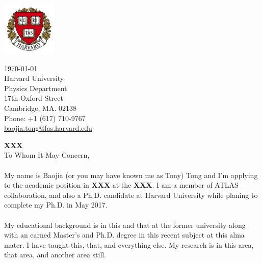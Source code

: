 \documentclass[letterpaper,11pt,oneside]{article}
\begin{document}
\begin{minipage}{.5\textwidth}
  \includegraphics[height=7em]{Harvard}
\end{minipage}
\begin{minipage}{.5\textwidth}
\begin{flushright}
 \today                           \\
 \vspace{1em}                              
 Harvard University            \\
 Physics Department                  \\
 17th Oxford Street                       \\
 Cambridge, MA. 02138   \\
 Phone: +1 (617) 710-9767         \\
\href{mailto:baojia.tong@fas.harvard.edu}{baojia.tong@fas.harvard.edu}  \\ 
\end{flushright}
\end{minipage}

\vspace{2em}
\textbf{XXX}\\
To Whom It May Concern, \\

\onehalfspacing
\paragraph{}
My name is Baojia (or you may have known me as Tony) Tong and I'm applying to the academic position in \textbf{XXX} at the \textbf{XXX}. I am a member of ATLAS collaboration, and also a Ph.D. candidate at Harvard University while planing to complete my Ph.D. in May 2017.

\paragraph{}
My educational background is in this and that at the former university along with an earned Master's and Ph.D. degree in this recent subject at this alma mater. I have taught this, that, and everything else. My research is in this area, that area, and another area still.
\end{document}
